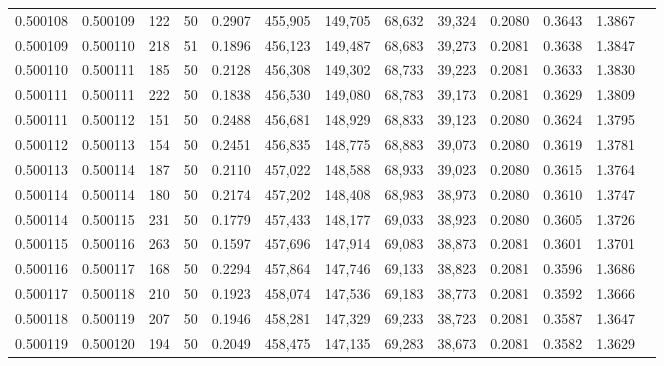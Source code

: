 \begin{tabular}{rrrrrrrrrrrrr}
0.500108 & 0.500109 & 122 &  50 &                                     0.2907 & 455,905 & 149,705 &  68,632 &  39,324 & 0.2080 & 0.3643 & 1.3867 \\
0.500109 & 0.500110 & 218 &  51 &                                     0.1896 & 456,123 & 149,487 &  68,683 &  39,273 & 0.2081 & 0.3638 & 1.3847 \\
0.500110 & 0.500111 & 185 &  50 &                                     0.2128 & 456,308 & 149,302 &  68,733 &  39,223 & 0.2081 & 0.3633 & 1.3830 \\
0.500111 & 0.500111 & 222 &  50 &                                     0.1838 & 456,530 & 149,080 &  68,783 &  39,173 & 0.2081 & 0.3629 & 1.3809 \\
0.500111 & 0.500112 & 151 &  50 &                                     0.2488 & 456,681 & 148,929 &  68,833 &  39,123 & 0.2080 & 0.3624 & 1.3795 \\
0.500112 & 0.500113 & 154 &  50 &                                     0.2451 & 456,835 & 148,775 &  68,883 &  39,073 & 0.2080 & 0.3619 & 1.3781 \\
0.500113 & 0.500114 & 187 &  50 &                                     0.2110 & 457,022 & 148,588 &  68,933 &  39,023 & 0.2080 & 0.3615 & 1.3764 \\
0.500114 & 0.500114 & 180 &  50 &                                     0.2174 & 457,202 & 148,408 &  68,983 &  38,973 & 0.2080 & 0.3610 & 1.3747 \\
0.500114 & 0.500115 & 231 &  50 &                                     0.1779 & 457,433 & 148,177 &  69,033 &  38,923 & 0.2080 & 0.3605 & 1.3726 \\
0.500115 & 0.500116 & 263 &  50 &                                     0.1597 & 457,696 & 147,914 &  69,083 &  38,873 & 0.2081 & 0.3601 & 1.3701 \\
0.500116 & 0.500117 & 168 &  50 &                                     0.2294 & 457,864 & 147,746 &  69,133 &  38,823 & 0.2081 & 0.3596 & 1.3686 \\
0.500117 & 0.500118 & 210 &  50 &                                     0.1923 & 458,074 & 147,536 &  69,183 &  38,773 & 0.2081 & 0.3592 & 1.3666 \\
0.500118 & 0.500119 & 207 &  50 &                                     0.1946 & 458,281 & 147,329 &  69,233 &  38,723 & 0.2081 & 0.3587 & 1.3647 \\
0.500119 & 0.500120 & 194 &  50 &                                     0.2049 & 458,475 & 147,135 &  69,283 &  38,673 & 0.2081 & 0.3582 & 1.3629 \\

\end{tabular}
